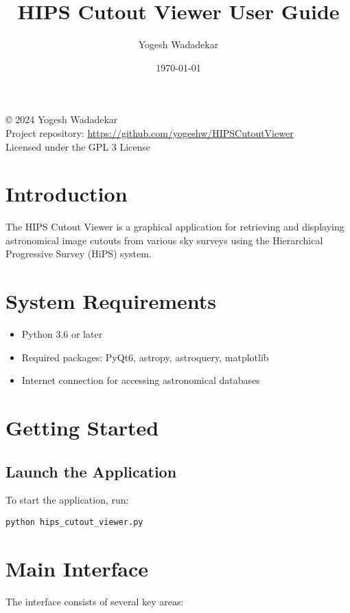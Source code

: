 \documentclass{article}
\title{HIPS Cutout Viewer User Guide}
\author{Yogesh Wadadekar}
\date{\today}
\begin{document}
\maketitle

\begin{center}
\copyright{} 2024 Yogesh Wadadekar\\
\vspace{0.5em}
Project repository: \url{https://github.com/yogeshw/HIPSCutoutViewer}\\
\vspace{0.5em}
Licensed under the GPL 3 License
\end{center}

\section{Introduction}
The HIPS Cutout Viewer is a graphical application for retrieving and displaying astronomical image cutouts from various sky surveys using the Hierarchical Progressive Survey (HiPS) system.

\section{System Requirements}
\begin{itemize}
    \item Python 3.6 or later
    \item Required packages: PyQt6, astropy, astroquery, matplotlib
    \item Internet connection for accessing astronomical databases
\end{itemize}

\section{Getting Started}
\subsection{Launch the Application}
To start the application, run:
\begin{verbatim}
python hips_cutout_viewer.py
\end{verbatim}

\section{Main Interface}
The interface consists of several key areas:
\end{document}
